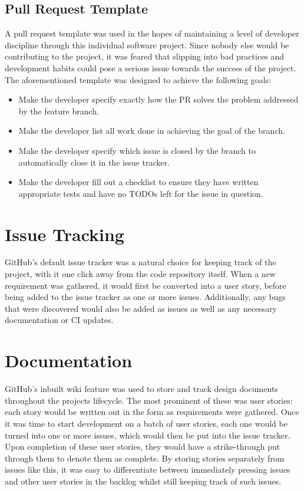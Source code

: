 \documentclass{l4proj}
\begin{document}
\subsection{Pull Request Template}
A pull request template was used in the hopes of maintaining a level of developer discipline through this individual software project. Since nobody else would be contributing to the project, it was feared that slipping into bad practices and development habits could pose a serious issue towards the success of the project. The aforementioned template was designed to achieve the following goals:
\begin{itemize}
    \item Make the developer specify exactly how the PR solves the problem addressed by the feature branch.
    \item Make the developer list all work done in achieving the goal of the branch.
    \item Make the developer specify which issue is closed by the branch to automatically close it in the issue tracker.
    \item Make the developer fill out a checklist to ensure they have written appropriate tests and have no TODOs left for the issue in question.
\end{itemize}

\section{Issue Tracking}\label{issue-tracker}
GitHub's default issue tracker was a natural choice for keeping track of the project, with it one click away from the code repository itself. When a new requirement was gathered, it would first be converted into a user story, before being added to the issue tracker as one or more issues. Additionally, any bugs that were discovered would also be added as issues as well as any necessary documentation or CI updates.
\section{Documentation}
GitHub's inbuilt wiki feature was used to store and track design documents throughout the projects lifecycle. The most prominent of these was user stories: each story would be written out in the form  as requirements were gathered. Once it was time to start development on a batch of user stories, each one would be turned into one or more issues, which would then be put into the issue tracker. Upon completion of these user stories, they would have a strike-through put through them to denote them as complete. By storing stories separately from issues like this, it was easy to differentiate between immediately pressing issues and other user stories in the backlog whilst still keeping track of such issues.
\end{document}
